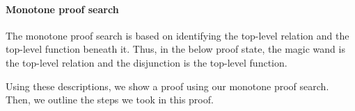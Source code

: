 \documentclass[thesis.tex]{subfiles}
\begin{document}
\paragraph{Monotone proof search}
The monotone proof search is based on identifying the top-level relation and the top-level function beneath it. Thus, in the below proof state, the magic wand is the top-level relation and the disjunction is the top-level function.
\begin{center}
\end{center}
Using these descriptions, we show a proof using our monotone proof search. Then, we outline the steps we took in this proof.
\end{document}
